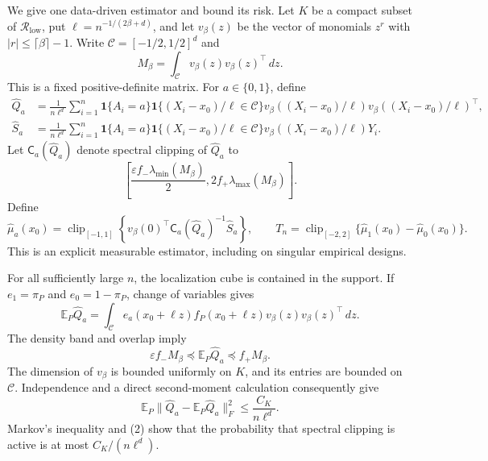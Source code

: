We give one data-driven estimator and bound its risk.  Let \(K\) be a compact
subset of \(\mathcal R_{\mathrm{low}}\), put
\(\ell=n^{-1/(2\beta+d)}\), and let
\(v_\beta(z)\) be the vector of monomials \(z^r\) with
\(|r|\leq\lceil\beta\rceil-1\).  Write
\(\mathcal C=[-1/2,1/2]^d\) and
\[
M_\beta=\int_{\mathcal C}v_\beta(z)v_\beta(z)^\top\,dz.
\]
This is a fixed positive-definite matrix.  For \(a\in\{0,1\}\), define
\[
\begin{aligned}
\widehat Q_a
&=\frac1{n\ell^d}\sum_{i=1}^n
\mathbf1\{A_i=a\}\mathbf1\{(X_i-x_0)/\ell\in\mathcal C\}
v_\beta((X_i-x_0)/\ell)v_\beta((X_i-x_0)/\ell)^\top,\\
\widehat S_a
&=\frac1{n\ell^d}\sum_{i=1}^n
\mathbf1\{A_i=a\}\mathbf1\{(X_i-x_0)/\ell\in\mathcal C\}
v_\beta((X_i-x_0)/\ell)Y_i.
\end{aligned}
\]
Let \(\mathsf C_a(\widehat Q_a)\) denote spectral clipping of
\(\widehat Q_a\) to
\[
\left[\frac{\varepsilon f_-\lambda_{\min}(M_\beta)}2,
2f_+\lambda_{\max}(M_\beta)\right].
\]
Define
\[
\widehat\mu_a(x_0)=\operatorname{clip}_{[-1,1]}\!\left\{
v_\beta(0)^\top\mathsf C_a(\widehat Q_a)^{-1}\widehat S_a\right\},\qquad
T_n=\operatorname{clip}_{[-2,2]}\{\widehat\mu_1(x_0)-\widehat\mu_0(x_0)\}.
\]
This is an explicit measurable estimator, including on singular empirical
designs.

For all sufficiently large \(n\), the localization cube is contained in the
support.  If \(e_1=\pi_P\) and \(e_0=1-\pi_P\), change of variables gives
\[
\mathbb E_P\widehat Q_a
=\int_{\mathcal C}e_a(x_0+\ell z)f_P(x_0+\ell z)
v_\beta(z)v_\beta(z)^\top\,dz.
\]
The density band and overlap imply
\[
\varepsilon f_-M_\beta\preceq\mathbb E_P\widehat Q_a\preceq f_+M_\beta.
\tag{2}
\]
The dimension of \(v_\beta\) is bounded uniformly on \(K\), and its entries
are bounded on \(\mathcal C\).  Independence and a direct second-moment
calculation consequently give
\[
\mathbb E_P\lVert\widehat Q_a-\mathbb E_P\widehat Q_a\rVert_F^2
\leq\frac{C_K}{n\ell^d}.
\]
Markov's inequality and (2) show that the probability that spectral clipping
is active is at most \(C_K/(n\ell^d)\).

